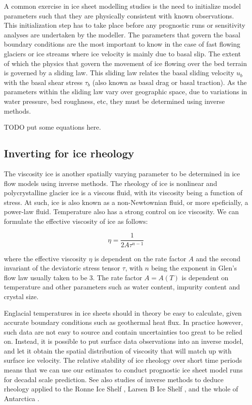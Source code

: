 A common exercise in ice sheet modelling studies is the need to initialize model parameters such that they are physically consistent with known observations.
This initialization step has to take place before any prognostic runs or sensitivity analyses are undertaken by the modeller.
The parameters that govern the basal boundary conditions are the most important to know in the case of fast flowing glaciers or ice streams where ice velocity is mainly due to basal slip.
The extent of which the physics that govern the movement of ice flowing over the bed terrain is governed by a sliding law.
This sliding law relates the basal sliding velocity $u_b$ with the basal shear stress $\tau_b$ (also known as basal drag or basal traction).
As the parameters within the sliding law vary over geographic space, due to variations in water pressure, bed roughness, etc, they must be determined using inverse methods.

TODO put some equations here.

\subsection{Inverting for ice rheology}

The viscosity ice is another spatially varying parameter to be determined in ice flow models using inverse methods.
The rheology of ice is nonlinear and polycrystalline glacier ice is a viscous fluid, with its viscosity being a function of stress.
At such, ice is also known as a non-Newtownian fluid, or more speficially, a power-law fluid.
Temperature also has a strong control on ice viscosity.
We can formulate the effective viscosity of ice as follows:

\begin{equation}
  \eta = \frac{1}{2A\tau^{n-1}}
\end{equation}

where the effective viscosity $\eta$ is dependent on the rate factor $A$ and the second invariant of the deviatoric stress tensor $\tau$, with $n$ being the exponent in Glen's flow law usually taken to be 3.
The rate factor $A = A(T)$ is dependent on temperature and other parameters such as water content, impurity content and crystal size.

Englacial temperatures in ice sheets should in theory be easy to calculate, given accurate boundary conditions such as geothermal heat flux.
In practice however, such data are not easy to source and contain uncertainties too great to be relied on.
Instead, it is possible to put surface data observations into an inverse model, and let it obtain the spatial distribution of viscosity that will match up with surface ice velocity.
The relative stability of ice rheology over short time periods means that we can use our estimates to conduct prognostic ice sheet model runs for decadal scale prediction.
See also studies of inverse methods to deduce rheology applied to the Ronne Ice Shelf \citep{LarourRheologyRonneIce2005}, Larsen B Ice Shelf \citep{KhazendarLarsenIceShelf2007}, and the whole of Antarctica \citep{ArthernFlowspeedAntarctic2015}.
